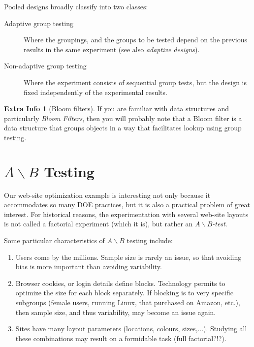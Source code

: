 \documentclass[12pt,a4paper]{report}
\theoremstyle{plain}
\theoremstyle{definition}
\newtheorem{extra}{Extra Info}
\begin{document}
Pooled designs broadly classify into two classes: 
\begin{description}
\item [Adaptive group testing] Where the groupings, and the groups to be tested depend on the previous results in the same experiment (see also \emph{adaptive designs}).
\item [Non-adaptive group testing] Where the experiment consists of sequential group tests, but the design is fixed independently of the experimental results. 
\end{description}


\begin{extra}[Bloom filters]
If you are familiar with data structures and particularly \emph{Bloom Filters}, then you will probably note that a Bloom filter is a data structure that groups objects in a way that facilitates lookup using group testing. 
\end{extra}



\section{$A\backslash B$ Testing}
Our web-site optimization example is interesting not only because it accommodates so many DOE practices, but it is also a practical problem of great interest.
For historical reasons, the experimentation with several web-site layouts is not called a factorial experiment (which it is), but rather an \emph{$A\backslash B$-test}.

Some particular characteristics of $A\backslash B$ testing include:
\begin{enumerate}
\item Users come by the millions. Sample size is rarely an issue, so that avoiding bias is more important than avoiding variability.
\item Browser cookies, or login details define blocks. Technology permits to optimize the size for each block separately. If blocking is to very specific subgroups (female users, running Linux, that purchased on Amazon, etc.), then sample size, and thus variability, may become an issue again.
\item Sites have many layout parameters (locations, colours, sizes,...). Studying all these combinations may result on a formidable task (full factorial?!?).
\end{enumerate}
\end{document}
